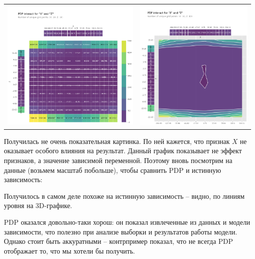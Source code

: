\noindent
\begin{tabular}{c|c}
	\arrayrulecolor[rgb]{0.8,0.85,1}
	\includegraphics[width=0.5\linewidth]{pics/pdpxz1.png} & \includegraphics[width=0.42\linewidth]{pics/pdpxz2.png} \\
\end{tabular}

Получилась не очень показательная картинка. По ней кажется, что признак $X$ не оказывает особого влияния на результат. Данный график показывает не эффект признаков, а значение зависимой переменной. Поэтому вновь посмотрим на данные (возьмем масштаб побольше), чтобы сравнить PDP и истинную зависимость:

\begin{figure}[h]
\end{figure}

Получилось в самом деле похоже на истинную зависимость -- видно, по линиям уровня на 3D-графике.

PDP оказался довольно-таки хорош: он показал извлеченные из данных и модели зависимости, что полезно при анализе выборки и результатов работы модели. Однако стоит быть аккуратными -- контрпример показал, что не всегда PDP отображает то, что мы хотели бы получить.